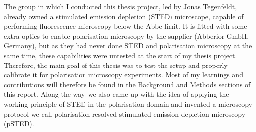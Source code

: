 The group in which I conducted this thesis project, led by Jonas Tegenfeldt, already owned a stimulated emission depletion (STED) microscope, capable of performing fluorescence microscopy below the Abbe limit. It is fitted with some extra optics to enable polarisation microscopy by the supplier (Abberior GmbH, Germany), but as they had never done STED and polarisation microscopy at the same time, these capabilities were untested at the start of my thesis project. Therefore, the main goal of this thesis was to test the setup and properly calibrate it for polarisation microscopy experiments. Most of my learnings and contributions will therefore be found in the Background and Methods sections of this report. Along the way, we also came up with the idea of applying the working principle of STED in the polarisation domain and invented a microscopy protocol we call polarisation-resolved stimulated emission depletion microscopy (pSTED).